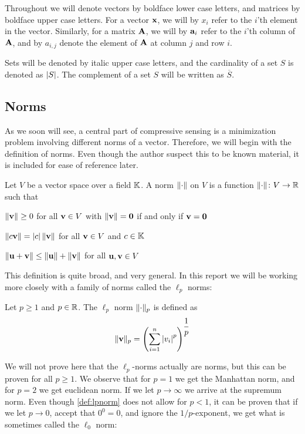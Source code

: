 Throughout we will denote vectors by boldface lower case letters, and matrices by boldface upper case letters. For a vector $ \mathbf{x} $, we will by $ x_{i} $ refer to the $ i $'th element in the vector. Similarly, for a matrix $ \mathbf{A} $, we will by $ \mathbf{a}_{i} $ refer to the $ i $'th  column of $ \mathbf{A} $, and by $ a_{i, j} $ denote the element of $ \mathbf{A} $ at column $ j $ and row $ i $.

Sets will be denoted by italic upper case letters, and the cardinality of a set $ S $ is denoted as $ \left|S\right| $. The complement of a set $ S $ will be written as $ \overline{S} $. 

\subsection{Norms}
As we soon will see, a central part of compressive sensing is a minimization problem involving different norms of a vector. Therefore, we will begin with the definition of norms. Even though the author suspect this to be known material, it is included for ease of reference later.

\begin{definition} \label{def:norm}
	Let $ V $ be a vector space over a field $ \mathbb{K} $.  A norm $ \lVert\cdot\rVert $ on $ V $ is a function $ \lVert\cdot\rVert\colon V \to\mathbb{R} $ such that
	\begin{subdef}
		\item $ \lVert\mathbf{v}\rVert \geq 0 $ for all $ \mathbf{v} \in V $ with $ \lVert\mathbf{v}\rVert = \mathbf{0} $ if and only if $ \mathbf{v} = \mathbf{0} $
		\item $ \lVert c\mathbf{v}\rVert = \left|c\right|\lVert\mathbf{v}\rVert $ for all $ \mathbf{v} \in V $ and $ c \in \mathbb{K} $
		\item $ \lVert\mathbf{u} + \mathbf{v}\rVert \leq \lVert\mathbf{u}\rVert + \lVert\mathbf{v}\rVert $ for all $ \mathbf{u},  \mathbf{v} \in V $
	\end{subdef}
\end{definition}

This definition is quite broad, and very general. In this report we will be working more closely with a family of norms called the $ \ell_{p} $ norms:

\begin{definition} \label{def:lpnorm}
	Let $ p \geq 1 $ and $ p \in \mathbb{R} $. The $ \ell_{p} $ norm $ \lVert\cdot\rVert_{p} $ is defined as
	\[
		\lVert\mathbf{v}\rVert_{p} = \left( \sum_{i=1}^{n} \left|v_{i}\right|^{p} \right)^{\dfrac{1}{p}}
	\]
\end{definition}

We will not prove here that the $ \ell_{p} $-norms actually are norms, but this can be proven for all $ p\geq 1 $. We observe that for $ p=1 $ we get the Manhattan norm, and for $ p=2 $ we get euclidean norm. If we let $ p\to\infty $ we arrive at the supremum norm. Even though \cref{def:lpnorm} does not allow for $ p < 1 $, it can be proven that if we let $ p\to0 $, accept that $ 0^{0} = 0 $, and ignore the $ 1/p $-exponent, we get what is sometimes called the $ \ell_{0} $ norm:

